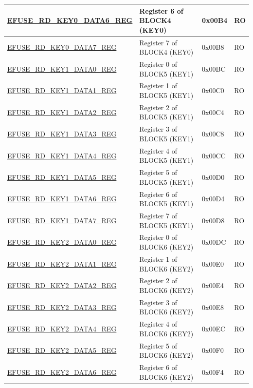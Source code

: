 \begin{longtable}{ | p{6.8cm} | p{7cm} | p{1.3cm} | p{1.2cm} | }
\hyperref[regdesc:EFUSERDKEY0DATA6REG]{EFUSE\_RD\_KEY0\_DATA6\_REG} & Register 6 of BLOCK4 (KEY0) & 0x00B4 & RO \\ \hline
\hyperref[regdesc:EFUSERDKEY0DATA7REG]{EFUSE\_RD\_KEY0\_DATA7\_REG} & Register 7 of BLOCK4 (KEY0) & 0x00B8 & RO \\ \hline
\hyperref[regdesc:EFUSERDKEY1DATA0REG]{EFUSE\_RD\_KEY1\_DATA0\_REG} & Register 0 of BLOCK5 (KEY1) & 0x00BC & RO \\ \hline
\hyperref[regdesc:EFUSERDKEY1DATA1REG]{EFUSE\_RD\_KEY1\_DATA1\_REG} & Register 1 of BLOCK5 (KEY1) & 0x00C0 & RO \\ \hline
\hyperref[regdesc:EFUSERDKEY1DATA2REG]{EFUSE\_RD\_KEY1\_DATA2\_REG} & Register 2 of BLOCK5 (KEY1) & 0x00C4 & RO \\ \hline
\hyperref[regdesc:EFUSERDKEY1DATA3REG]{EFUSE\_RD\_KEY1\_DATA3\_REG} & Register 3 of BLOCK5 (KEY1) & 0x00C8 & RO \\ \hline
\hyperref[regdesc:EFUSERDKEY1DATA4REG]{EFUSE\_RD\_KEY1\_DATA4\_REG} & Register 4 of BLOCK5 (KEY1) & 0x00CC & RO \\ \hline
\hyperref[regdesc:EFUSERDKEY1DATA5REG]{EFUSE\_RD\_KEY1\_DATA5\_REG} & Register 5 of BLOCK5 (KEY1) & 0x00D0 & RO \\ \hline
\hyperref[regdesc:EFUSERDKEY1DATA6REG]{EFUSE\_RD\_KEY1\_DATA6\_REG} & Register 6 of BLOCK5 (KEY1) & 0x00D4 & RO \\ \hline
\hyperref[regdesc:EFUSERDKEY1DATA7REG]{EFUSE\_RD\_KEY1\_DATA7\_REG} & Register 7 of BLOCK5 (KEY1) & 0x00D8 & RO \\ \hline
\hyperref[regdesc:EFUSERDKEY2DATA0REG]{EFUSE\_RD\_KEY2\_DATA0\_REG} & Register 0 of BLOCK6 (KEY2) & 0x00DC & RO \\ \hline
\hyperref[regdesc:EFUSERDKEY2DATA1REG]{EFUSE\_RD\_KEY2\_DATA1\_REG} & Register 1 of BLOCK6 (KEY2) & 0x00E0 & RO \\ \hline
\hyperref[regdesc:EFUSERDKEY2DATA2REG]{EFUSE\_RD\_KEY2\_DATA2\_REG} & Register 2 of BLOCK6 (KEY2) & 0x00E4 & RO \\ \hline
\hyperref[regdesc:EFUSERDKEY2DATA3REG]{EFUSE\_RD\_KEY2\_DATA3\_REG} & Register 3 of BLOCK6 (KEY2) & 0x00E8 & RO \\ \hline
\hyperref[regdesc:EFUSERDKEY2DATA4REG]{EFUSE\_RD\_KEY2\_DATA4\_REG} & Register 4 of BLOCK6 (KEY2) & 0x00EC & RO \\ \hline
\hyperref[regdesc:EFUSERDKEY2DATA5REG]{EFUSE\_RD\_KEY2\_DATA5\_REG} & Register 5 of BLOCK6 (KEY2) & 0x00F0 & RO \\ \hline
\hyperref[regdesc:EFUSERDKEY2DATA6REG]{EFUSE\_RD\_KEY2\_DATA6\_REG} & Register 6 of BLOCK6 (KEY2) & 0x00F4 & RO \\ \hline

\end{longtable}

